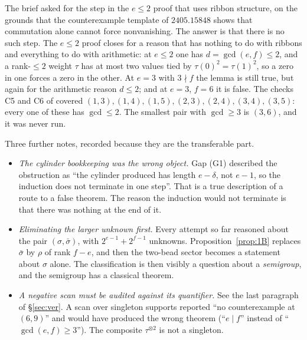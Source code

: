 \documentclass[11pt]{article}
\theoremstyle{definition}
\theoremstyle{remark}
\begin{document}
The brief asked for the step in the $e\le2$ proof that uses ribbon structure, on the grounds
that the counterexample template of $2405.15848$ shows that commutation alone cannot force
nonvanishing.  The answer is that there is no such step.  The $e\le2$ proof closes for a
reason that has nothing to do with ribbons and everything to do with arithmetic: at $e\le2$
one has $d=\gcd(e,f)\le2$, and a rank-$\le2$ weight $\tau$ has at most two values tied by
$\tau(0)^2=\tau(1)^2$, so a zero in one forces a zero in the other.  At $e=3$ with
$3\nmid f$ the lemma is still true, but again for the arithmetic reason $d\le2$; and at
$e=3$, $f=6$ it is false.  The checks C5 and C6 of \cite{Q149} covered
$(1,3),(1,4),(1,5),(2,3),(2,4),(3,4),(3,5)$: every one of these has $\gcd\le2$.  The smallest
pair with $\gcd\ge3$ is $(3,6)$, and it was never run.

Three further notes, recorded because they are the transferable part.
\begin{itemize}
\item \emph{The cylinder bookkeeping was the wrong object.}  Gap (G1) described the
  obstruction as ``the cylinder produced has length $e-\delta$, not $e-1$, so the induction
  does not terminate in one step''.  That is a true description of a route to a false
  theorem.  The reason the induction would not terminate is that there was nothing at the
  end of it.
\item \emph{Eliminating the larger unknown first.}  Every attempt so far reasoned about the
  pair $(\sigma,\bar\sigma)$, with $2^{e-1}+2^{f-1}$ unknowns.  Proposition~\ref{prop:1B}
  replaces $\bar\sigma$ by $\rho$ of rank $f-e$, and then the two-bead sector becomes a
  statement about $\sigma$ alone.  The classification is then visibly a question about a
  \emph{semigroup}, and the semigroup has a classical theorem.
\item \emph{A negative scan must be audited against its quantifier.}  See the last paragraph
  of §\ref{sec:ver}.  A scan over singleton supports reported ``no counterexample at
  $(6,9)$'' and would have produced the wrong theorem (``$e\mid f$'' instead of
  ``$\gcd(e,f)\ge3$'').  The composite $\tau^{\otimes2}$ is not a singleton.
\end{itemize}
\end{document}

